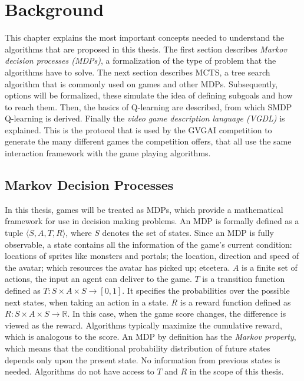 \chapter{Background}
\label{sec:background}

This chapter explains the most important concepts needed to understand the
algorithms that are proposed in this thesis. The first section describes
\emph{Markov decision processes (MDPs)}, a formalization of the type of problem
that the algorithms have to solve. The next section describes MCTS, a tree
search algorithm that is commonly used on games and other MDPs. Subsequently,
options will be formalized, these simulate the idea of defining subgoals and
how to reach them. Then, the basics of Q-learning are described, from which SMDP
Q-learning is derived. Finally the \emph{video game description language (VGDL)}
is explained. This is the protocol that is used by the GVGAI competition to
generate the many different games the competition offers, that all use the same
interaction framework with the game playing algorithms.

\section{Markov Decision Processes}
\label{subsec:mdps}
In this thesis, games will be treated as MDPs, which provide a mathematical
framework for use in decision making problems. An MDP is formally defined as a
tuple $\langle S, A, T, R \rangle$, where $S$ denotes the set of states. Since an MDP
is fully observable, a state contains all the information of the
game's current condition: locations of sprites like monsters and portals; the
location, direction and speed of the avatar; which resources the avatar has
picked up; etcetera. $A$ is a finite set of actions, the input an agent can
deliver to the game. $T$ is a transition function defined as $T : S \times A
\times S \rightarrow \left[0,1\right]$. It specifies the probabilities over the
possible next states, when taking an action in a state.  $R$ is a reward
function defined as $R: S \times A \times S \rightarrow \mathbb{R}$. In this
case, when the game score changes, the difference is viewed as the reward.
Algorithms typically maximize the cumulative reward, which is analogous to the
score. An MDP by definition has the \emph{Markov property}, which means that the
conditional probability distribution of future states depends only upon the
present state. No information from previous states is needed. Algorithms do not
have access to $T$ and $R$ in the scope of this thesis.

